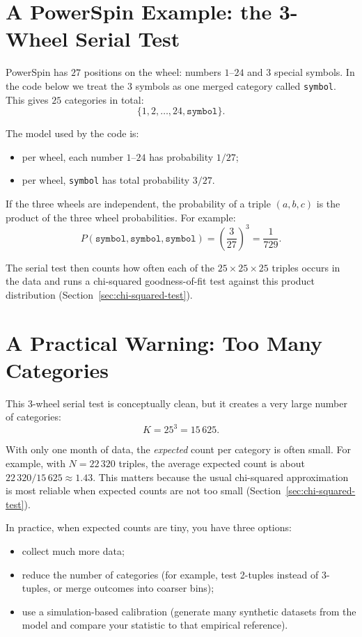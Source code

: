 \section{A PowerSpin Example: the 3-Wheel Serial Test}
PowerSpin has \(27\) positions on the wheel: numbers \(1\)--\(24\) and 3 special
symbols.  In the code below we treat the 3 symbols as one merged category
called \texttt{symbol}.  This gives \(25\) categories in total:
\[
  \{1,2,\dots,24,\texttt{symbol}\}.
\]

The model used by the code is:
\begin{itemize}
  \item per wheel, each number \(1\)--\(24\) has probability \(1/27\);
  \item per wheel, \texttt{symbol} has total probability \(3/27\).
\end{itemize}

If the three wheels are independent, the probability of a triple
\((a,b,c)\) is the product of the three wheel probabilities.  For example:
\[
  P(\texttt{symbol},\texttt{symbol},\texttt{symbol}) = \left(\frac{3}{27}\right)^3 = \frac{1}{729}.
\]

The serial test then counts how often each of the \(25\times 25\times 25\)
triples occurs in the data and runs a chi-squared goodness-of-fit test against
this product distribution (Section~\ref{sec:chi-squared-test}).

\section{A Practical Warning: Too Many Categories}
This 3-wheel serial test is conceptually clean, but it creates a very large
number of categories:
\[
  K = 25^3 = 15\,625.
\]

With only one month of data, the \emph{expected} count per category is often
small.  For example, with \(N = 22\,320\) triples, the average expected count is
about \(22\,320/15\,625 \approx 1.43\).  This matters because the usual
chi-squared approximation is most reliable when expected counts are not too
small (Section~\ref{sec:chi-squared-test}).

In practice, when expected counts are tiny, you have three options:
\begin{itemize}
  \item collect much more data;
  \item reduce the number of categories (for example, test 2-tuples instead of
        3-tuples, or merge outcomes into coarser bins);
  \item use a simulation-based calibration (generate many synthetic datasets
        from the model and compare your statistic to that empirical reference).
\end{itemize}

